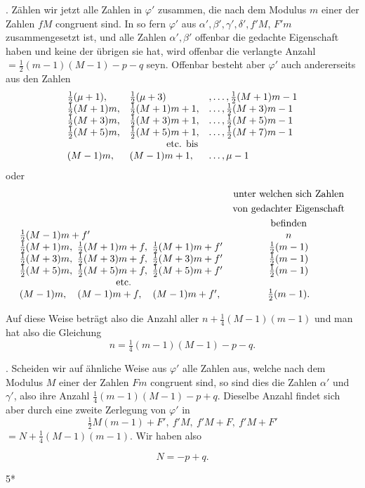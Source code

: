 \par{}. Zählen wir jetzt alle Zahlen in $\varphi'$ zusammen, die nach dem Modulus $m$ einer der Zahlen $fM$ congruent sind. In so fern $\varphi'$ aus $\alpha',\beta',\gamma',\delta',f'M$, $F'm$ zusammengesetzt ist, und alle Zahlen $\alpha',\beta'$ offenbar die gedachte Eigenschaft haben und keine der übrigen sie hat, wird offenbar die verlangte Anzahl $=\tfrac12(m-1)(M-1)-p-q$ seyn. Offenbar besteht aber $\varphi'$ auch andererseits aus den Zahlen
\[
\begin{array}{lll}
\tfrac12(\mu+1),&\tfrac12(\mu+3)&,\ldots,\tfrac12(M+1)m-1\\
\tfrac12(M+1)m,&\tfrac12(M+1)m+1,&\ldots,\tfrac12(M+3)m-1\\
\tfrac12(M+3)m,&\tfrac12(M+3)m+1,&\ldots,\tfrac12(M+5)m-1\\
\tfrac12(M+5)m,&\tfrac12(M+5)m+1,&\ldots,\tfrac12(M+7)m-1\\
\multicolumn{3}{c}{\text{etc. bis}}\\
(M-1)m,&(M-1)m+1,&\ldots,\mu-1
\end{array}
\]
\noindent oder
\begingroup\small
\[
\begin{array}{l@{\quad}c}
&\begin{gathered}\text{unter welchen sich Zahlen}\\\text{von gedachter Eigenschaft}\\\text{befinden}\end{gathered}\\
\tfrac12(M-1)m+f'&n\\
\tfrac12(M+1)m,\ \tfrac12(M+1)m+f,\ \tfrac12(M+1)m+f'&\tfrac12(m-1)\\
\tfrac12(M+3)m,\ \tfrac12(M+3)m+f,\ \tfrac12(M+3)m+f'&\tfrac12(m-1)\\
\tfrac12(M+5)m,\ \tfrac12(M+5)m+f,\ \tfrac12(M+5)m+f'&\tfrac12(m-1)\\
\multicolumn{1}{c}{\text{etc.}}&\\
(M-1)m,\quad(M-1)m+f,\quad(M-1)m+f',&\tfrac12(m-1).
\end{array}
\]
\endgroup
\par\noindent\hspace*{\parindent}Auf diese Weise beträgt also die Anzahl aller $n+\tfrac14(M-1)(m-1)$ und man hat also die Gleichung
\[
n=\tfrac14(m-1)(M-1)-p-q.
\]
\par{}. Scheiden wir auf ähnliche Weise aus $\varphi'$ alle Zahlen aus, welche nach dem Modulus $M$ einer der Zahlen $Fm$ congruent sind, so sind dies die Zahlen $\alpha'$ und $\gamma'$, also ihre Anzahl $\tfrac14(m-1)(M-1)-p+q$. Dieselbe Anzahl findet sich aber durch eine zweite Zerlegung von $\varphi'$ in
\[
\tfrac12M(m-1)+F',\ f'M,\ f'M+F,\ f'M+F'
\]
\noindent $=N+\tfrac14(M-1)(m-1)$. Wir haben also\par
\[
N=-p+q.
\]
\par\vfill\noindent\hfill5*\par
\clearpage

